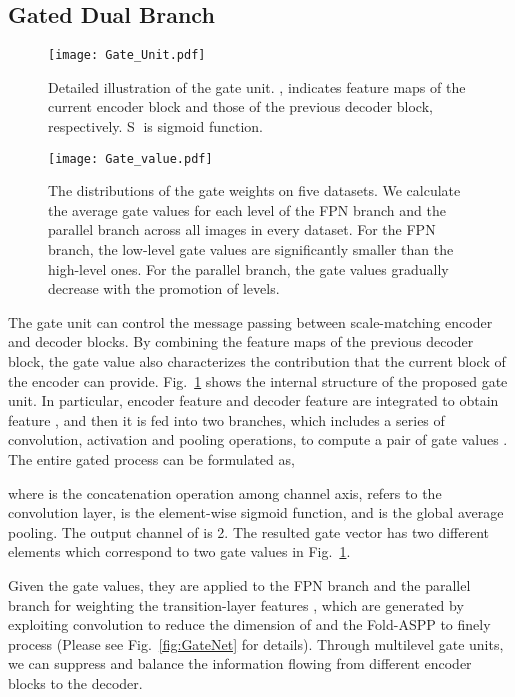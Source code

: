 \documentclass[runningheads]{llncs}
\begin{document}
	
	
	\subsection{Gated Dual Branch}\label{sec:Gated Dual Branch}
	
\begin{figure}[t]
		\centering
		\texttt{[image: Gate\_Unit.pdf]}
		\caption{Detailed illustration of the gate unit. ,  indicates feature maps of the current encoder block and those of the previous decoder block, respectively. \textcircled{\scriptsize S} is sigmoid function.}\label{fig:Gate_Unit}
\end{figure}
	
	\begin{figure}[t]
		\centering
		\texttt{[image: Gate\_value.pdf]}
		\caption{The distributions of the gate weights on  five datasets. We calculate the average gate values for each level of the FPN branch and the parallel branch across all images in every dataset. For the FPN branch, the low-level gate values are significantly smaller than the high-level ones. For the parallel branch, the gate values gradually decrease with the promotion of levels.}\label{fig:Gate_value}
\end{figure}
	
	The gate unit can control the message passing between scale-matching encoder and decoder blocks. By combining the feature maps of the previous decoder block, the gate value also characterizes the contribution that the current block of the encoder can provide. 
Fig.~\ref{fig:Gate_Unit} shows the internal structure of the proposed gate unit. In particular, encoder feature  and decoder feature  are integrated to obtain feature , and then it is fed into two branches, which includes a series of convolution, activation and pooling operations, to compute a pair of gate values .   
	The entire gated process can be formulated as,
	
	where  is the concatenation operation among channel axis,  refers to the convolution layer,  is the element-wise sigmoid function, and  is the global average pooling. The output channel of  is 2. The resulted gate vector  has two different elements which correspond to two gate values in Fig.~\ref{fig:Gate_Unit}.
	
	Given the gate values, they are applied to the FPN branch and the parallel branch for weighting the transition-layer features , which are generated by exploiting  convolution to reduce the dimension of  and the Fold-ASPP to finely process  (Please see Fig.~\ref{fig:GateNet} for details). Through multilevel gate units, we can suppress and balance the information flowing from different encoder blocks to the decoder. 
	
\end{document}
